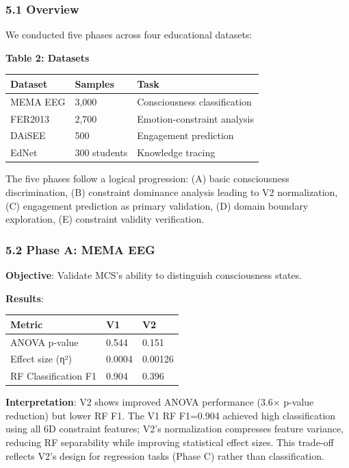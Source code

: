 \documentclass[
]{article}
\newcounter{none} %
\begin{document}
\subsubsection{5.1 Overview}\label{overview}

We conducted five phases across four educational datasets:

\textbf{Table 2: Datasets}

{\def\LTcaptype{none} %
\begin{longtable}[]{@{}lll@{}}
\toprule\noalign{}
Dataset & Samples & Task \\
\midrule\noalign{}
\endhead
\bottomrule\noalign{}
\endlastfoot
MEMA EEG & 3,000 & Consciousness classification \\
FER2013 & 2,700 & Emotion-constraint analysis \\
DAiSEE & 500 & Engagement prediction \\
EdNet & 300 students & Knowledge tracing \\
\end{longtable}
}

The five phases follow a logical progression: (A) basic consciousness
discrimination, (B) constraint dominance analysis leading to V2
normalization, (C) engagement prediction as primary validation, (D)
domain boundary exploration, (E) constraint validity verification.

\subsubsection{5.2 Phase A: MEMA EEG}\label{phase-a-mema-eeg}

\textbf{Objective}: Validate MCS's ability to distinguish consciousness
states.

\textbf{Results}:

{\def\LTcaptype{none} %
\begin{longtable}[]{@{}lll@{}}
\toprule\noalign{}
Metric & V1 & V2 \\
\midrule\noalign{}
\endhead
\bottomrule\noalign{}
\endlastfoot
ANOVA p-value & 0.544 & 0.151 \\
Effect size (η²) & 0.0004 & 0.00126 \\
RF Classification F1 & 0.904 & 0.396 \\
\end{longtable}
}

\textbf{Interpretation}: V2 shows improved ANOVA performance (3.6×
p-value reduction) but lower RF F1. The V1 RF F1=0.904 achieved high
classification using all 6D constraint features; V2's normalization
compresses feature variance, reducing RF separability while improving
statistical effect sizes. This trade-off reflects V2's design for
regression tasks (Phase C) rather than classification.
\end{document}
